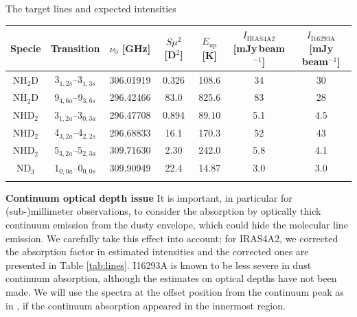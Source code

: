 \documentclass[12pt,a4paper]{article}  %
\begin{document}
\vspace{-1.2em}
\begin{center}
\begin{threeparttable}[tbh]
\caption[]{The target lines and expected intensities}
\begin{tabular}{ccccccc}
\hline \noalign {\smallskip}
Specie & Transition & $\nu_0$ [GHz] & $S\mu^2$ [D$^{2}$] & $E_\mathrm{up}$ [K] & $I_\mathrm{IRAS4A2}$ [mJy\,beam$^{-1}$] & $I_\mathrm{I16293A}$ [mJy beam$^{-1}$] \\
\hline \noalign {\smallskip}
NH$_2$D & 3$_{1,2s}$--3$_{1,3s}$ & 306.01919 & 0.326 & 108.6 & 34 & 30 \\
NH$_2$D & 9$_{4,6a}$--9$_{3,6s}$ & 296.42466 & 83.0 & 825.6 & 83 & 28 \\
NHD$_2$ & 3$_{1,2a}$--3$_{0,3a}$ & 296.47708 & 0.894 & 89.10 & 5.1 & 4.5 \\
NHD$_2$ & 4$_{3,2a}$--4$_{2,2s}$ & 296.68833 & 16.1 & 170.3 & 52 & 43\\
NHD$_2$ & 5$_{3,2a}$--5$_{2,3a}$ & 309.71630 & 2.30 & 242.0 & 5.8 & 4.1\\
ND$_3$ & 1$_{0,0a}$--0$_{0,0s}$ & 309.90949	& 22.4 & 14.87 & 3.0 & 3.0 \\
\hline \noalign {\smallskip}
\end{tabular}
\label{tab:lines}
\end{threeparttable}
\end{center}

\smallskip
\noindent \textbf{Continuum optical depth issue} \quad It is important, in particular for (sub-)millimeter observations, to consider the absorption by optically thick continuum emission from the dusty envelope, which could hide the molecular line emission. We carefully take this effect into account; for IRAS4A2, we corrected the absorption factor \citep[$e^{-\tau_\mathrm{c}}$ where $\tau_\mathrm{c}\sim0.6$ is the dust optical depth at $\sim$300\,GHz;][ with assuming an opacity slope of $\beta=1$]{DeSimone20} in estimated intensities and the corrected ones are presented in Table \ref{tab:lines}. I16293A is known to be less severe in dust continuum absorption, although the estimates on optical depths have not been made. We will use the spectra at the offset position from the continuum peak as in \citet{Manigand20}, if the continuum absorption appeared in the innermost region.
\end{document}
